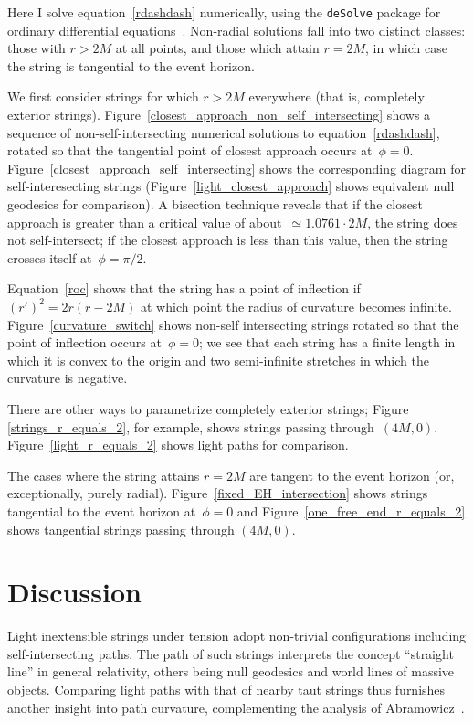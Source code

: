 \documentclass[review]{elsarticle}
\begin{document}
Here I solve equation~\ref{rdashdash} numerically, using the
\verb+deSolve+ package for ordinary differential
equations~\cite{soetart2010}.  Non-radial solutions fall into two
distinct classes: those with $r>2M$ at all points, and those which
attain $r=2M$, in which case the string is tangential to the event
horizon.

We first consider strings for which $r>2M$ everywhere (that is,
completely exterior strings).
Figure~\ref{closest_approach_non_self_intersecting} shows a sequence
of non-self-intersecting numerical solutions to
equation~\ref{rdashdash}, rotated so that the tangential point of
closest approach occurs at~$\phi=0$.
Figure~\ref{closest_approach_self_intersecting} shows the
corresponding diagram for self-interesecting strings
(Figure~\ref{light_closest_approach} shows equivalent null geodesics
for comparison).  A bisection technique reveals that if the closest
approach is greater than a critical value of about~$\simeq 1.0761\cdot
2M$, the string does not self-intersect; if the closest approach is
less than this value, then the string crosses itself at~$\phi=\pi/2$.

Equation~\ref{roc} shows that the string has a point of inflection
if~$\left(r'\right)^2=2r(r-2M)$ at which point the radius of curvature
becomes infinite.  Figure~\ref{curvature_switch} shows non-self
intersecting strings rotated so that the point of inflection occurs
at~$\phi=0$; we see that each string has a finite length in which it
is convex to the origin and two semi-infinite stretches in which the
curvature is negative.

There are other ways to parametrize completely exterior strings;
Figure \ref{strings_r_equals_2}, for example, shows strings passing
through~$(4M,0)$.  Figure~\ref{light_r_equals_2} shows light paths for
comparison.

The cases where the string attains $r=2M$ are tangent to the event
horizon (or, exceptionally, purely radial).
Figure~\ref{fixed_EH_intersection} shows strings tangential to the
event horizon at~$\phi=0$ and Figure~\ref{one_free_end_r_equals_2}
shows tangential strings passing through $(4M,0)$.

\section{Discussion}

Light inextensible strings under tension adopt non-trivial
configurations including self-intersecting paths.  The path of such
strings interprets the concept ``straight line'' in general
relativity, others being null geodesics and world lines of massive
objects.  Comparing light paths with that of nearby taut strings thus
furnishes another insight into path curvature, complementing the
analysis of Abramowicz~\cite{abramowicz1992}.
\end{document}
